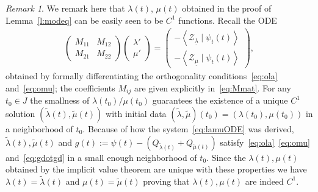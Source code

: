 \documentclass[10pt,reqno]{amsart}
\newcommand{\ZZ}{\mathcal{Z}}
\newcommand{\la}{\lambda}
\newcommand{\La}{\Lambda}
\newcommand{\ti}{\widetilde}
\newcommand{\ang}[1]{\left\langle{#1}\right\rangle}
\newcommand{\EQ}[1]{\begin{equation}\begin{split} #1 \end{split}\end{equation}}
\newcommand{\pmat}[1]{\begin{pmatrix} #1 \end{pmatrix}}
\numberwithin{equation}{section}
\theoremstyle{remark}
\newtheorem{rem}[thm]{Remark}
\newcommand{\ula}{\underline{\lambda}}
\newcommand{\umu}{\underline{\mu}}
\newcommand{\0}{\emptyset}
\begin{document}
\begin{rem}\label{r:ODE} 
We remark here that $\la(t)$, $\mu(t)$ obtained in the proof of Lemma~\ref{l:modeq} can be easily seen to be  $C^1$ functions. Recall the ODE 
\EQ{\label{eq:lamuODE} 
  \pmat{ M_{11} & M_{12} \\ M_{21} & M_{22}} \pmat{ \la' \\ \mu'} =  \pmat{ -\ang{\ZZ_{\ula} \mid  \psi_t(t)} \\ -  \ang{ \ZZ_{\umu} \mid \psi_t(t)} }, 
  }
 obtained by formally differentiating the orthogonality conditions~\eqref{eq:ola} and~\eqref{eq:omu}; the coefficients $M_{ij}$ are given explicitly in~\eqref{eq:Mmat}. For any $t_0 \in J$ the smallness of $\la(t_0)/ \mu(t_0)$ guarantees the existence of a unique $C^1$ solution  $(\ti \la(t), \ti\mu(t))$ with initial data $(\ti \la, \ti \mu)(t_0) = (\la(t_0), \mu(t_0))$ in a neighborhood of $t_0$. Because of how the system~\eqref{eq:lamuODE} was derived, $\ti \la(t), \ti \mu(t)$ and $g(t) := \psi(t) - (Q_{\ti \la(t)} + Q_{\ti \mu(t)})$ satisfy~\eqref{eq:ola}~\eqref{eq:omu} and~\eqref{eq:gdotgd} in a small enough neighborhood of $t_0$. Since the $\la(t), \mu(t)$ obtained by the implicit value theorem are unique with these properties we have $\la(t) = \ti \la(t)$ and $\mu(t) = \ti \mu(t)$ proving that $\la(t), \mu(t)$ are indeed $C^1$. 
%
  
\end{rem} 
\end{document}
